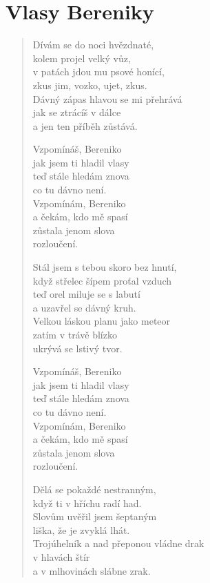 \section{Vlasy Bereniky}

\thispagestyle{empty}

\begin{multicols}{2}
\begin{verse}

Dívám se do noci hvězdnaté,\\
kolem projel velký vůz,\\
v patách jdou mu psové honící,\\
zkus jim, vozko, ujet, zkus.\\
Dávný zápas hlavou se mi přehrává\\
jak se ztrácíš v dálce\\
a jen ten příběh zůstává.

Vzpomínáš, Bereniko\\
jak jsem ti hladil vlasy\\
teď stále hledám znova\\
co tu dávno není.\\
Vzpomínám, Bereniko\\
a čekám, kdo mě spasí\\
zůstala jenom slova\\
rozloučení.

Stál jsem s tebou skoro bez hnutí,\\
když střelec šípem proťal vzduch\\
teď orel miluje se s labutí\\
a uzavřel se dávný kruh.\\
Velkou láskou planu jako meteor\\
zatím v trávě blízko\\
ukrývá se lstivý tvor.

Vzpomínáš, Bereniko\\
jak jsem ti hladil vlasy\\
teď stále hledám znova\\
co tu dávno není.\\
Vzpomínám, Bereniko\\
a čekám, kdo mě spasí\\
zůstala jenom slova\\
rozloučení.

Dělá se pokaždé nestranným,\\
když ti v hříchu radí had.\\
Slovům uvěřil jsem šeptaným\\
liška, že je zvyklá lhát.\\
Trojúhelník a nad přeponou vládne drak\\
v hlavách štír\\
a v mlhovinách slábne zrak.


\end{verse}
\end{multicols}
